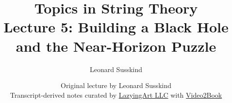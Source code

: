\documentclass[11pt,oneside]{book}
\begin{document}
\frontmatter
\title{Topics in String Theory\\[0.5em]
\large Lecture 5: Building a Black Hole and the Near-Horizon Puzzle}
\author{Leonard Susskind}
\date{Original lecture by Leonard Susskind\\[0.4em]
Transcript-derived notes curated by
\href{https://lazying.art}{LazyingArt LLC} with
\href{https://github.com/lachlanchen/Video2Book}{Video2Book}}
\maketitle
\mainmatter

\end{document}
